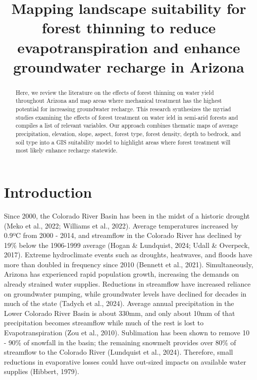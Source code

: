 \documentclass[
]{agujournal2019}
\begin{document}
\title{Mapping landscape suitability for forest thinning to reduce
evapotranspiration and enhance groundwater recharge in Arizona}



\begin{abstract}
Here, we review the literature on the effects of forest thinning on
water yield throughout Arizona and map areas where mechanical treatment
has the highest potential for increasing groundwater recharge. This
research synthesizes the myriad studies examining the effects of forest
treatment on water ield in semi-arid forests and compiles a list of
relevant variables. Our approach combines thematic maps of average
precipitation, elevation, slope, aspect, forest type, forest density,
depth to bedrock, and soil type into a GIS suitability model to
highlight areas where forest treatment will most likely enhance recharge
statewide.
\end{abstract}




\section{Introduction}\label{introduction}

Since 2000, the Colorado River Basin has been in the midst of a historic
drought (Meko et al., 2022; Williams et al., 2022). Average temperatures
increased by 0.9ºC from 2000 - 2014, and streamflow in the Colorado
River has declined by 19\% below the 1906-1999 average (Hogan \&
Lundquist, 2024; Udall \& Overpeck, 2017). Extreme hydroclimate events
such as droughts, heatwaves, and floods have more than doubled in
frequency since 2010 (Bennett et al., 2021). Simultaneously, Arizona has
experienced rapid population growth, increasing the demands on already
strained water supplies. Reductions in streamflow have increased
reliance on groundwater pumping, while groundwater levels have declined
for decades in much of the state (Tadych et al., 2024). Average annual
precipitation in the Lower Colorado River Basin is about 330mm, and only
about 10mm of that precipitation becomes streamflow while much of the
rest is lost to Evapotranspiration (Zou et al., 2010). Sublimation has
been shown to remove 10 - 90\% of snowfall in the basin; the remaining
snowmelt provides over 80\% of streamflow to the Colorado River
(Lundquist et al., 2024). Therefore, small reductions in evaporative
losses could have out-sized impacts on available water supplies
(Hibbert, 1979).
\end{document}
